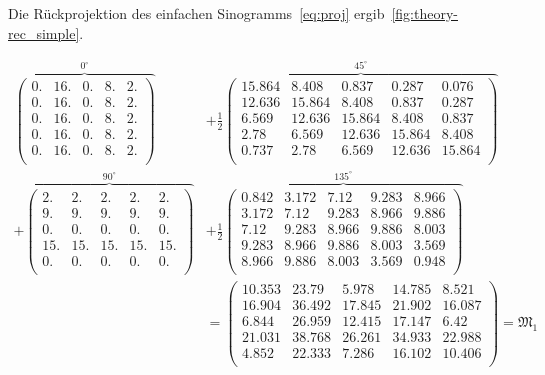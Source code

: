 \documentclass[slug=PET, room=Andreas-Schubert-Bau\,\ 424A, supervisor=Carsten\ Bittrich, coursedate=10.\ 01.\ 2020]{../../Lab_Report_LaTeX/lab_report}
\begin{document}
Die R\"uckprojektion des einfachen Sinogramms~\eqref{eq:proj}
ergib~\ref{fig:theory-rec_simple}.

{\footnotesize
\setlength{\arraycolsep}{2.5pt}

\begin{align}
  \label{eq:simplerepr}
  \overbrace{\begin{pmatrix}
      0. & 16. & 0. & 8. & 2.\\
      0. & 16. & 0. & 8. & 2.\\
      0. & 16. & 0. & 8. & 2.\\
      0. & 16. & 0. & 8. & 2.\\
      0. & 16. & 0. & 8. & 2.\\
    \end{pmatrix}}^{0^\circ} & + \frac{1}{2}\overbrace{\begin{pmatrix}
      15.864 & 8.408 & 0.837 & 0.287 & 0.076\\
      12.636 & 15.864 & 8.408 & 0.837 & 0.287\\
      6.569 & 12.636 & 15.864 & 8.408 & 0.837\\
      2.78 & 6.569 & 12.636 & 15.864 & 8.408\\
      0.737 & 2.78 & 6.569 & 12.636 & 15.864\\
    \end{pmatrix}}^{45^\circ} \nonumber \\ + \overbrace{\begin{pmatrix}
      2. & 2. & 2. & 2. & 2.\\
      9. & 9. & 9. & 9. & 9.\\
      0. & 0. & 0. & 0. & 0.\\
      15. & 15. & 15. & 15. & 15.\\
      0. & 0. & 0. & 0. & 0.\\
    \end{pmatrix}}^{90^\circ} &+ \frac{1}{2}\overbrace{\begin{pmatrix}
      0.842 & 3.172 & 7.12 & 9.283 & 8.966\\
      3.172 & 7.12 & 9.283 & 8.966 & 9.886\\
      7.12 & 9.283 & 8.966 & 9.886 & 8.003\\
      9.283 & 8.966 & 9.886 & 8.003 & 3.569\\
      8.966 & 9.886 & 8.003 & 3.569 & 0.948\\
    \end{pmatrix}}^{135^\circ}\nonumber \\
  & = \begin{pmatrix}
    10.353 & 23.79 & 5.978 & 14.785 & 8.521\\
    16.904 & 36.492 & 17.845 & 21.902 & 16.087\\
    6.844 & 26.959 & 12.415 & 17.147 & 6.42\\
    21.031 & 38.768 & 26.261 & 34.933 & 22.988\\
    4.852 & 22.333 & 7.286 & 16.102 & 10.406\\
  \end{pmatrix} = \mathfrak{M}_1
\end{align}}
\end{document}
